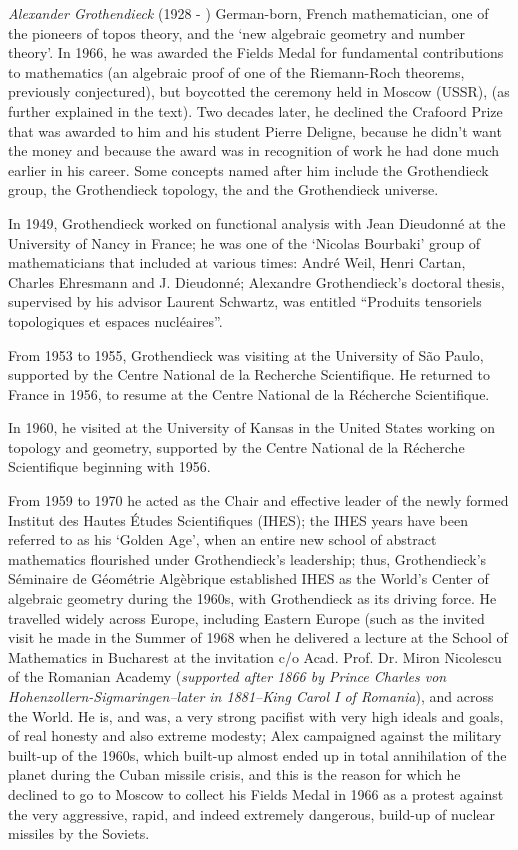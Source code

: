 \documentclass[12pt]{article}
\begin{document}
\emph{Alexander Grothendieck} (1928 - ) German-born, French mathematician, one of the pioneers of topos theory, and the 
`new algebraic geometry and number theory'. In 1966, he was awarded the Fields Medal for fundamental contributions to mathematics (an algebraic proof of one of the Riemann-Roch theorems, previously conjectured), but boycotted the ceremony held in Moscow (USSR), (as further explained in the text). Two decades later, he declined the Crafoord Prize that was awarded to him and his student Pierre Deligne, because he didn't want the money and because the award was in recognition of work he had done much earlier in his career. Some concepts named after him include the Grothendieck group, the Grothendieck topology, the  and the Grothendieck universe.

In 1949, Grothendieck worked on functional analysis with Jean Dieudonn\'e at the University of Nancy in France; he was one of the `Nicolas Bourbaki' group of mathematicians that included at various times: Andr\'e Weil, Henri Cartan, Charles Ehresmann and J. Dieudonn\'e; Alexandre Grothendieck's doctoral thesis, supervised by his advisor Laurent Schwartz, was entitled ``Produits tensoriels topologiques et espaces nucl\'eaires''.

From 1953 to 1955, Grothendieck was visiting at the University of S\~ao Paulo, supported by the Centre National de la Recherche Scientifique. He returned to France in 1956, to resume at the Centre National de la R\'echerche Scientifique.

In 1960, he visited at the University of Kansas in the United States working on topology and geometry, supported by the Centre National de la R\'echerche Scientifique beginning with 1956.

From 1959 to 1970 he acted as the Chair and effective leader of the newly formed Institut des Hautes \'Etudes Scientifiques (IHES); the IHES years have been referred to as his `Golden Age', when an entire new school of abstract mathematics flourished under Grothendieck's leadership; thus, Grothendieck's S\'eminaire de G\'eom\'etrie Alg\`ebrique \cite{ALEXsem1, Alexsem2} established IHES as the World's Center of algebraic geometry during the 1960s, with Grothendieck as its driving force. He travelled widely across Europe, including Eastern Europe (such as the invited visit he made in the Summer of 1968 when he delivered a lecture at the School of Mathematics in Bucharest at the invitation c/o Acad. Prof. Dr. Miron Nicolescu of the Romanian Academy ({\em supported after 1866 by Prince Charles von Hohenzollern-Sigmaringen--later in 1881--King Carol I of Romania}), and across the World. He is, and was, a very strong pacifist with very high ideals and goals, of real honesty and also extreme modesty; Alex campaigned against the military built-up of the 1960s, which built-up almost ended up in total annihilation of the planet during the Cuban missile crisis, and this is the reason for which he declined to go to Moscow to collect his Fields Medal in 1966 as a protest against the very aggressive, rapid, and indeed extremely dangerous, build-up of nuclear missiles by the Soviets.
\end{document}
